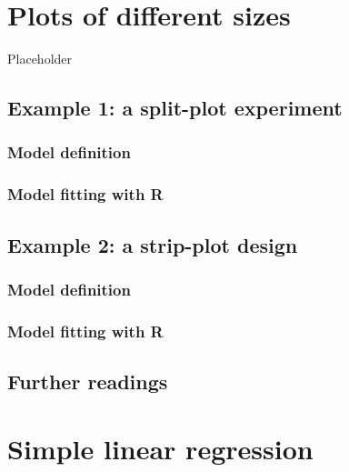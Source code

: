 \documentclass[a4paper,12pt,oneside]{book}
\begin{document}
\hypertarget{plots-of-different-sizes}{%
\chapter{Plots of different sizes}\label{plots-of-different-sizes}}

Placeholder

\hypertarget{example-1-a-split-plot-experiment}{%
\section{Example 1: a split-plot experiment}\label{example-1-a-split-plot-experiment}}

\hypertarget{model-definition-4}{%
\subsection{Model definition}\label{model-definition-4}}

\hypertarget{model-fitting-with-r-2}{%
\subsection{Model fitting with R}\label{model-fitting-with-r-2}}

\hypertarget{example-2-a-strip-plot-design}{%
\section{Example 2: a strip-plot design}\label{example-2-a-strip-plot-design}}

\hypertarget{model-definition-5}{%
\subsection{Model definition}\label{model-definition-5}}

\hypertarget{model-fitting-with-r-3}{%
\subsection{Model fitting with R}\label{model-fitting-with-r-3}}

\hypertarget{further-readings-9}{%
\section{Further readings}\label{further-readings-9}}

\hypertarget{simple-linear-regression}{%
\chapter{Simple linear regression}\label{simple-linear-regression}}
\end{document}
